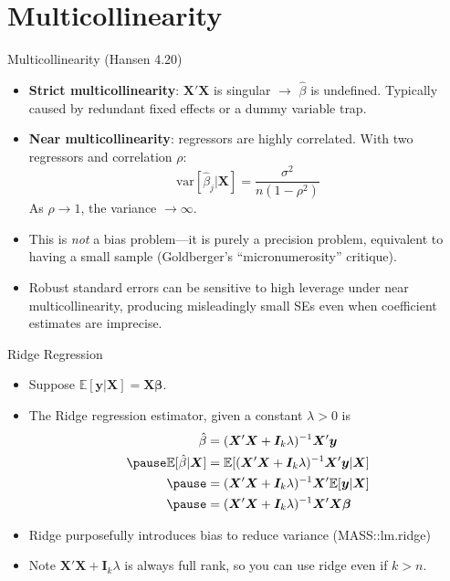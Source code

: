 \documentclass[aspectratio=169, handout, t]{beamer}
\numberwithin{equation}{section}
\begin{document}
 \section{Multicollinearity}
 
 \begin{frame}{Multicollinearity (Hansen 4.20)}
\begin{itemize}
\item \textbf{Strict multicollinearity}: $\bm{X'\!X}$ is singular $\rightarrow$ $\hat{\beta}$ is undefined.  Typically caused by redundant fixed effects or a dummy variable trap. \pause
\item \textbf{Near multicollinearity}: regressors are highly correlated.  With two regressors and correlation $\rho$:
$$\text{var}[\hat{\beta}_j|\bm{X}]=\frac{\sigma^2}{n(1-\rho^2)}$$
As $\rho\to 1$, the variance $\to\infty$.  \pause
\item This is \emph{not} a bias problem---it is purely a precision problem, equivalent to having a small sample (Goldberger's ``micronumerosity'' critique). \pause
\item Robust standard errors can be \alert{sensitive to high leverage} under near multicollinearity, producing misleadingly small SEs even when coefficient estimates are imprecise.
\end{itemize}
 \end{frame}


 \begin{frame}{Ridge Regression}
\begin{itemize}
\item Suppose $\mathbb{E}[\bm{y}|\bm{X}]=\bm{X\beta}$.
\item The Ridge regression estimator, given a constant $\lambda>0$ is 
\begin{align*}
\hat{\beta}&=(\bm{X}'\bm{X}+\bm{I}_k \lambda)^{-1}\bm{X}'\bm{y}\\ \pause
\mathbb{E}[\hat{\beta}|\bm{X}]&=\mathbb{E}[(\bm{X}'\bm{X}+\bm{I}_k \lambda)^{-1}\bm{X}'\bm{y}|\bm{X}]\\ \pause
&=(\bm{X}'\bm{X}+\bm{I}_k \lambda)^{-1}\bm{X}'\mathbb{E}[\bm{y}|\bm{X}]\\ \pause
&=(\bm{X}'\bm{X}+\bm{I}_k \lambda)^{-1}\bm{X}'\bm{X\beta}
\end{align*}
\item Ridge purposefully introduces bias to reduce variance (MASS::lm.ridge)
\item Note $\bm{X}'\bm{X}+\bm{I}_k \lambda$ is always full rank, so you can use ridge even if $k>n$.
\end{itemize}
 \end{frame}
 
\end{document}
